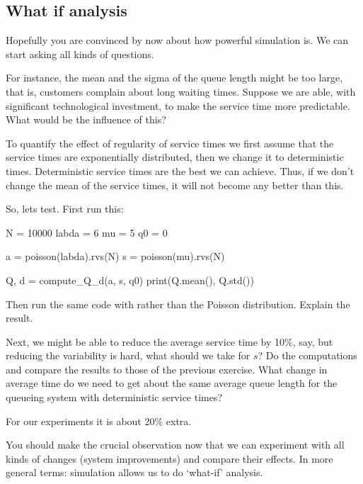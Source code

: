 \documentclass{scrartcl}
\begin{document}
\subsection{What if analysis}
\label{sec:what-if-analysis}

Hopefully you  are  convinced by now about how powerful simulation is.  We can start asking all kinds of questions.

\begin{exercise}
  For instance,  the mean and the sigma of the queue length might be too large, that is, customers complain about long waiting times.  Suppose we are able, with significant technological investment, to make the service time more predictable. What would be the influence of this?

To quantify the effect of regularity of service times we first assume that the service times are exponentially distributed, then we change it to deterministic times.
 Deterministic service times are the best we can achieve. Thus, if we don't change the mean of the service times, it will not become any better than this.


So, lets test. First run this:
\begin{pyverbatim}
N = 10000
labda = 6
mu = 5
q0 = 0

a = poisson(labda).rvs(N)
s = poisson(mu).rvs(N)

Q, d = compute_Q_d(a, s, q0)
print(Q.mean(), Q.std())
  \end{pyverbatim}
  Then run the same code with  rather than the Poisson distribution. Explain the result.
\end{exercise}



\begin{exercise}
  Next, we might be able to reduce the average service time by 10\%, say, but reducing the variability is hard, what should we take for $s$? Do the computations and compare the results to those of the previous exercise. What change in average time do we need to get about the same average queue length for the queueing system with deterministic service times?
  \begin{solution}
For our experiments it is about 20\% extra.
  \end{solution}
\end{exercise}



You should make the crucial observation now that we can experiment with all kinds of changes (system improvements) and compare their effects. In more general terms: simulation allows us to do `what-if' analysis. 
\end{document}
